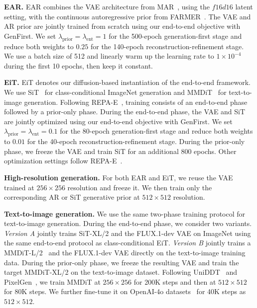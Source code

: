 \documentclass[]{bytedance_seed}
\begin{document}
\textbf{EAR.}
EAR combines the VAE architecture from MAR~\cite{mar}, using the $f16d16$ latent setting, with the continuous autoregressive prior from FARMER~\cite{zheng2025farmer}. 
The VAE and AR prior are jointly trained from scratch using our end-to-end objective with GenFirst.
We set $\lambda_{\mathrm{prior}}=\lambda_{\mathrm{ent}}=1$ for the 500-epoch generation-first stage and reduce both weights to $0.25$ for the 140-epoch reconstruction-refinement stage.
We use a batch size of 512 and linearly warm up the learning rate to $1\times10^{-4}$ during the first 10 epochs, then keep it constant.

\textbf{EiT.}
EiT denotes our diffusion-based instantiation of the end-to-end framework.
We use SiT~\cite{sit} for class-conditional ImageNet generation and MMDiT~\cite{mmdit} for text-to-image generation.
Following REPA-E~\cite{repa_e}, training consists of an end-to-end phase followed by a prior-only phase. 
During the end-to-end phase, the VAE and SiT are jointly optimized using our end-to-end objective with GenFirst.
We set $\lambda_{\mathrm{prior}}=\lambda_{\mathrm{ent}}=0.1$ for the 80-epoch generation-first stage and reduce both weights to $0.01$ for the 40-epoch reconstruction-refinement stage.
During the prior-only phase, we freeze the VAE and train SiT for an additional 800 epochs.
Other optimization settings follow REPA-E~\cite{repa_e}.

\textbf{High-resolution generation.}
For both EAR and EiT, we reuse the VAE trained at $256\times256$ resolution and freeze it. We then train only the corresponding AR or SiT generative prior at $512\times512$ resolution.

\textbf{Text-to-image generation.}
We use the same two-phase training protocol for text-to-image generation.
During the end-to-end phase, we consider two variants.
\textit{Version A} jointly trains SiT-XL/2 and the FLUX.1-dev VAE on ImageNet using the same end-to-end protocol as class-conditional EiT.
\textit{Version B} jointly trains a MMDiT-L/2~\cite{mmdit} and the FLUX.1-dev VAE directly on the text-to-image training data.
During the prior-only phase, we freeze the resulting VAE and train the target MMDiT-XL/2 on the text-to-image dataset.
Following UniDDT~\cite{wang2026uniddt} and PixelGen~\cite{ma2026pixelgen}, we train MMDiT at $256\times256$ for 200K steps and then at $512\times512$ for 80K steps. 
We further fine-tune it on OpenAI-4o datasets~\cite{open4o} for 40K steps as $512\times512$.
\end{document}
